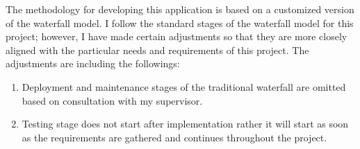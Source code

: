 \begin{justify}
\noindent
The methodology for developing this application is based on a customized version of the waterfall model. I follow the standard stages of the waterfall model for this project; however, I have made certain adjustments so that they are more closely aligned with the particular needs and requirements of this project. The adjustments are including the followings:
\vspace{0.25cm}
\begin{enumerate}
    \item Deployment and maintenance stages of the traditional waterfall are omitted based on consultation with my supervisor.
    \item Testing stage does not start after implementation rather it will start as soon as the requirements are gathered and continues throughout the project.
\end{enumerate}


\end{justify}
